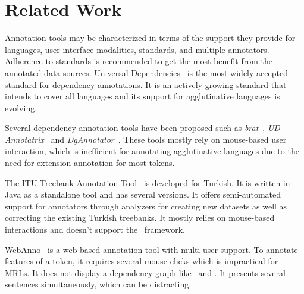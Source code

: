 \section{Related Work}
\label{sec:related}

Annotation tools may be characterized in terms of the support they provide for languages, user interface modalities, standards, and multiple annotators.
Adherence to standards is recommended to get the most benefit from the annotated data sources.
Universal Dependencies~\cite{UD} is the most widely accepted standard for dependency annotations.
It is an actively growing standard that intends to cover all languages and its support for agglutinative languages is evolving.

Several dependency annotation tools have been proposed such as \textit{brat}~\cite{brat}, \textit{UD Annotatrix}~\cite{tyers-etal:2018} and \textit{DgAnnotator}~\cite{dgannotator,UD-tools}.
These tools mostly rely on mouse-based user interaction, which is inefficient for annotating agglutinative languages due to the need for extension annotation for most tokens.

The ITU Treebank Annotation Tool~\cite{pamay-etal-2015-annotation} is developed for Turkish.
It is written in Java as a standalone tool and has several versions.
It offers semi-automated support for annotators through analyzers for creating new datasets as well as correcting the existing Turkish treebanks.
It mostly relies on mouse-based interactions and doesn't support the \ud\ framework.

WebAnno~\cite{webanno} is a web-based annotation tool with multi-user support.
To annotate features of a token, it requires several mouse clicks which is impractical for MRLs.
It does not display a dependency graph like \boatvone\ and \boatvtwo.
It presents several sentences simultaneously, which can be distracting.
